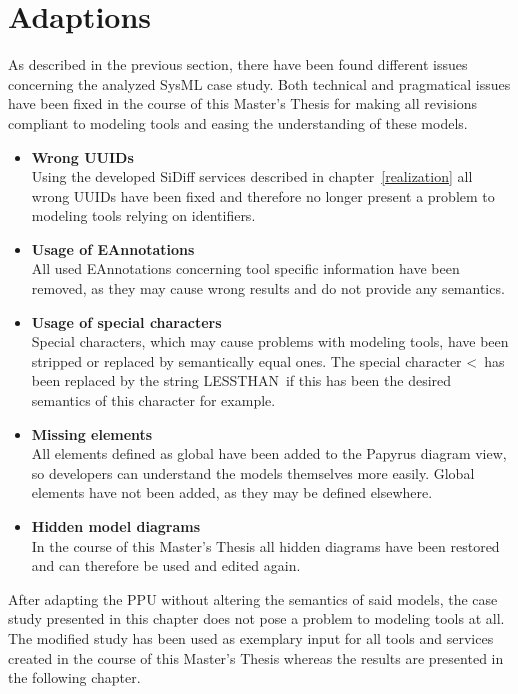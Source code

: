 \section{Adaptions}\label{sysml:adaptions}
As described in the previous section, there have been found different
issues concerning the analyzed \ac{SysML} case study. Both technical and pragmatical
issues have been fixed in the course of this Master's Thesis for making all
revisions compliant to modeling tools and easing the understanding of these
models.
\begin{itemize}
   \item \textbf{Wrong \ac{UUID}s}\\
   		 Using the developed SiDiff services described in chapter~\ref{realization}
   		 all wrong \ac{UUID}s have been fixed and therefore no longer present a
   		 problem to modeling tools relying on identifiers.
   \item \textbf{Usage of EAnnotations}\\
    	 All used EAnnotations concerning tool specific information have been
    	 removed, as they may cause wrong results and do not provide any semantics.
   \item \textbf{Usage of special characters}\\
   		 Special characters, which may cause problems with modeling tools, have
   		 been stripped or replaced by semantically equal ones. The special
   		 character \glqq <\grqq\ has been replaced by the string \glqq
   		 LESSTHAN\grqq\ if this has been the desired semantics of this character
   		 for example.
   \item \textbf{Missing elements}\\
   		 All elements defined as global have been added to the Papyrus diagram
   		 view, so developers can understand the models themselves more easily.
   		 Global elements have not been added, as they may be defined elsewhere.
   \item \textbf{Hidden model diagrams}\\
   		 In the course of this Master's Thesis all hidden diagrams have been
   		 restored and can therefore be used and edited again.
\end{itemize}

After adapting the \ac{PPU} without altering the semantics of said models, the
case study presented in this chapter does not pose a problem to modeling tools
at all. The modified study has been used as exemplary input for all tools and
services created in the course of this Master's Thesis whereas the results are
presented in the following chapter.